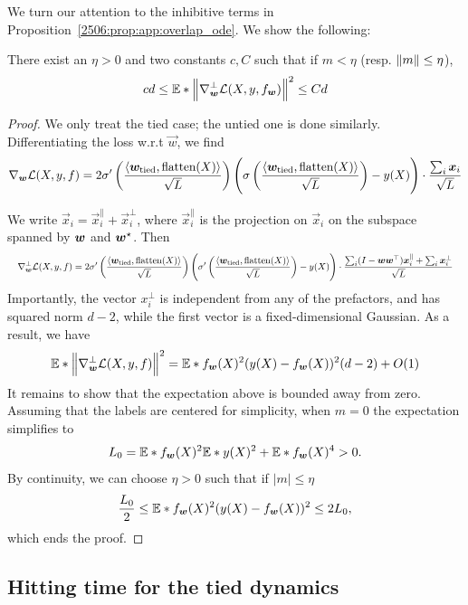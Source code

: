 We turn our attention to the inhibitive terms in Proposition~\ref{2506:prop:app:overlap_ode}. We show the following:
\begin{lemma}\label{2506:lem:app:grad_norm}
    There exist an $\eta > 0$ and two constants $c, C$ such that if  $m < \eta$ (resp. $\left\lVert m\right\rVert \leq \eta$),
    \[ cd \leq \mathbb{E}*{\left\lVert \nabla_{{\boldsymbol{w}}}^\bot \mathcal{L}(X, y, f_{{\boldsymbol{w}}})\right\rVert^2} \leq Cd \]
\end{lemma}
\begin{proof}
    We only treat the tied case; the untied one is done similarly. Differentiating the loss w.r.t $\vec{w}$, we find
    \[ \nabla_{{\boldsymbol{w}}} \mathcal{L}(X, y, f) = 2\sigma'\left( \frac{\langle {\boldsymbol{w}}_{\text{tied}}, \operatorname{flatten}(X)\rangle}{\sqrt{L}} \right)\left(\sigma\left( \frac{\langle {\boldsymbol{w}}_{\text{tied}}, \operatorname{flatten}(X)\rangle}{\sqrt{L}} \right) - y(X)\right) \cdot \frac{\sum_{i} {\boldsymbol{x}}_i }{\sqrt{L}} \]

We write $\vec{x}_i = \vec{x}_i^\parallel + \vec{x}_i^\bot$, where $\vec{x}_i^\parallel$ is the projection on $\vec{x}_i$ on the subspace spanned by ${\boldsymbol{w}}$ and ${\boldsymbol{w}}^\star$.
Then
\[
    \resizebox{\linewidth}{!}{$\displaystyle
      \nabla_{\vw}^\bot \cL(X, y, f) = 2\sigma'\left( \frac{\langle \vw_{\text{tied}}, \Flatten(X)\rangle}{\sqrt{L}} \right)\left(\sigma'\left( \frac{\langle \vw_{\text{tied}}, \Flatten(X)\rangle}{\sqrt{L}} \right) - y(X)\right) \cdot \frac{\sum_{i} (I - \vw \vw^\top) \vec{x}_i^\parallel + \sum_i \vec{x}_i^\bot }{\sqrt{L}}
    $}
  \]
Importantly, the vector $x_i^\bot$ is independent from any of the prefactors, and has squared norm $d-2$, while the first vector is a fixed-dimensional Gaussian. As a result, we have
\[ \mathbb{E}*{\left\lVert \nabla_{{\boldsymbol{w}}}^\bot \mathcal{L}(X, y, f)\right\rVert^2} = \mathbb{E}*{f_{{\boldsymbol{w}}}(X)^2(y(X) - f_{{\boldsymbol{w}}}(X))^2}(d-2) + O(1) \]
It remains to show that the expectation above is bounded away from zero. Assuming that the labels are centered for simplicity, when $m = 0$ the expectation simplifies to
\[ L_0 = \mathbb{E}*{f_{{\boldsymbol{w}}}(X)^2}\mathbb{E}*{y(X)^2} + \mathbb{E}*{f_{{\boldsymbol{w}}}(X)^4} > 0. \]
By continuity, we can choose $\eta > 0$ such that if $|m| \leq \eta$
\[ \frac{L_0}2 \leq \mathbb{E}*{f_{{\boldsymbol{w}}}(X)^2(y(X) - f_{{\boldsymbol{w}}}(X))^2} \leq 2L_0, \]
which ends the proof.
\end{proof}

\subsection{Hitting time for the tied dynamics}

